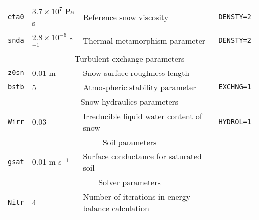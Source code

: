 \documentclass{article}
\begin{document}
\begin{longtable}{|l|l|l|l|}
{\tt eta0} & $3.7 \times 10^7$ Pa s  & Reference snow viscosity       &{\tt DENSTY=2}   \\
{\tt snda} & $2.8 \times 10^{-6}$ s$^{-1}$ & Thermal metamorphism parameter &{\tt DENSTY=2} \\
\hline
\hline 
\multicolumn{4}{|c|}{Turbulent exchange parameters} \\
\hline 
{\tt z0sn} & 0.01 m          & Snow surface roughness length          &               \\
{\tt bstb} & 5               & Atmospheric stability parameter        &{\tt EXCHNG=1} \\
\hline
\hline 
\multicolumn{4}{|c|}{Snow hydraulics parameters}                                      \\
\hline
{\tt Wirr} & 0.03          & Irreducible liquid water content of snow &{\tt HYDROL=1} \\
\hline
\hline 
\multicolumn{4}{|c|}{Soil parameters}                                                 \\
\hline 
{\tt gsat} & 0.01 m s$^{-1}$ & Surface conductance for saturated soil &               \\
\hline 
\hline 
\multicolumn{4}{|c|}{Solver parameters}                                               \\
\hline 
{\tt Nitr} & 4      & Number of iterations in energy balance calculation &            \\
\hline 
\end{longtable}
\end{document}
